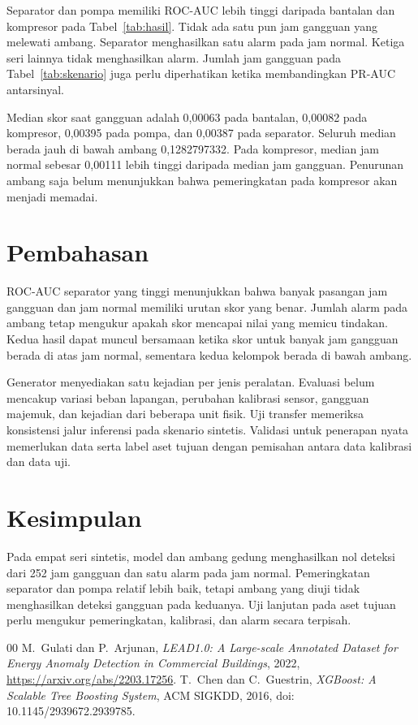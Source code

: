 \documentclass[conference]{IEEEtran}
\begin{document}
Separator dan pompa memiliki ROC-AUC lebih tinggi daripada bantalan dan kompresor pada Tabel~\ref{tab:hasil}. Tidak ada satu pun jam gangguan yang melewati ambang. Separator menghasilkan satu alarm pada jam normal. Ketiga seri lainnya tidak menghasilkan alarm. Jumlah jam gangguan pada Tabel~\ref{tab:skenario} juga perlu diperhatikan ketika membandingkan PR-AUC antarsinyal.

Median skor saat gangguan adalah 0,00063 pada bantalan, 0,00082 pada kompresor, 0,00395 pada pompa, dan 0,00387 pada separator. Seluruh median berada jauh di bawah ambang 0,1282797332. Pada kompresor, median jam normal sebesar 0,00111 lebih tinggi daripada median jam gangguan. Penurunan ambang saja belum menunjukkan bahwa pemeringkatan pada kompresor akan menjadi memadai.

\section{Pembahasan}
\enlargethispage{2\baselineskip}
ROC-AUC separator yang tinggi menunjukkan bahwa banyak pasangan jam gangguan dan jam normal memiliki urutan skor yang benar. Jumlah alarm pada ambang tetap mengukur apakah skor mencapai nilai yang memicu tindakan. Kedua hasil dapat muncul bersamaan ketika skor untuk banyak jam gangguan berada di atas jam normal, sementara kedua kelompok berada di bawah ambang.

Generator menyediakan satu kejadian per jenis peralatan. Evaluasi belum mencakup variasi beban lapangan, perubahan kalibrasi sensor, gangguan majemuk, dan kejadian dari beberapa unit fisik. Uji transfer memeriksa konsistensi jalur inferensi pada skenario sintetis. Validasi untuk penerapan nyata memerlukan data serta label aset tujuan dengan pemisahan antara data kalibrasi dan data uji.

\section{Kesimpulan}
Pada empat seri sintetis, model dan ambang gedung menghasilkan nol deteksi dari 252 jam gangguan dan satu alarm pada jam normal. Pemeringkatan separator dan pompa relatif lebih baik, tetapi ambang yang diuji tidak menghasilkan deteksi gangguan pada keduanya. Uji lanjutan pada aset tujuan perlu mengukur pemeringkatan, kalibrasi, dan alarm secara terpisah.

\begin{thebibliography}{00}
 M.~Gulati dan P.~Arjunan, \emph{LEAD1.0: A Large-scale Annotated Dataset for Energy Anomaly Detection in Commercial Buildings}, 2022, \url{https://arxiv.org/abs/2203.17256}.
 T.~Chen dan C.~Guestrin, \emph{XGBoost: A Scalable Tree Boosting System}, ACM SIGKDD, 2016, doi: 10.1145/2939672.2939785.
\end{thebibliography}
\end{document}
